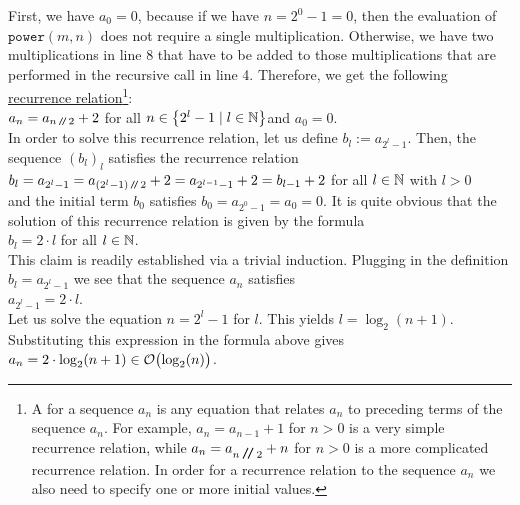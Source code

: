 First, we have $a_0 = 0$, because if we have $n = 2^0 - 1 = 0$, then the evaluation of 
$\mathtt{power}(m, n)$ does not require a single multiplication.
Otherwise, we have two multiplications in line 8 that have to be added to those multiplications
that are performed in the recursive call in line 4.  Therefore, we get the following
\href{http://en.wikipedia.org/wiki/Recurrence_relation}{recurrence relation}\footnote{
  A   for a sequence $a_n$ is any equation that relates
  $a_n$ to preceding terms of the sequence $a_n$.  For example, $a_n = a_{n-1} + 1$ for $n > 0$ is a very
  simple recurrence relation, while $a_n = a_{n \mbox{\,\texttt{/}$\!$\texttt{/}\,} 2} + n$ for $n > 0$ is a more complicated recurrence
  relation.  In order for a recurrence relation to  the sequence $a_n$ we also need to specify one
  or more initial values.  
}:
\\[0.2cm]
\hspace*{1.3cm}
$a_n = a_{n \mbox{\scriptsize\,\texttt{/}$\!$\texttt{/}\,} 2} + 2$ \qquad for all $n \in \left\{2^l - 1 \mid l \in {\mathbb N}\right\}$\quad and $a_0 = 0$. 
\\[0.2cm]
In order to solve this recurrence relation, let us define $b_l := a_{2^l-1}$.  Then, the sequence
$(b_l)_l$ 
satisfies the recurrence relation
 \\[0.2cm]
\hspace*{1.3cm} 
$b_l = a_{2^l-1} = a_{(2^l-1) \mbox{\scriptsize\,\texttt{/}$\!$\texttt{/}\,} 2} + 2 = a_{2^{l-1}-1} + 2 = b_{l-1} +2$ \qquad for all $l\in{\mathbb N}$ with
$l > 0$
\\[0.2cm]
and the initial term $b_0$ satisfies $b_0 = a_{2^0-1} = a_0 = 0$.  It is quite obvious that the
solution of this recurrence relation is given by the formula
\\[0.2cm]
\hspace*{1.3cm} $b_l = 2 \cdot l$ \qquad for all $l \in {\mathbb N}$. 
\\[0.2cm] 
This claim is readily established via a trivial induction.  Plugging in the definition $b_l = a_{2^l-1}$ we
see that the sequence $a_n$ satisfies \\[0.2cm]
\hspace*{1.3cm} $a_{2^l-1} = 2 \cdot l$. 
\\[0.2cm]
Let us solve the equation $n = 2^l - 1$ for $l$.  This yields
 $l =
\log_2(n+1)$.  Substituting this expression in the formula above gives \\[0.2cm]
\hspace*{1.3cm} $a_n = 2 \cdot \log_2(n+1) \in \mathcal{O}\bigl(\log_2(n)\bigr)$.
\vspace*{0.3cm}


